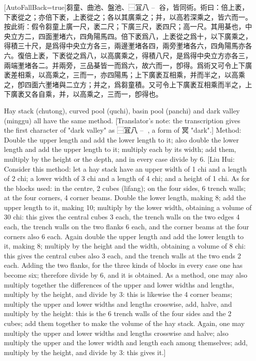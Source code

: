 \documentclass[11pt]{article}
\newcommand{\zhsmall}{\footnotesize\color{black!70}}
\newcommand{\unitlabel}[1]{\marginpar{\raggedleft\tiny\color{gray}#1}}
\newenvironment{unitzh}{\par\CJKfontspec{Noto Serif CJK SC}[AutoFallBack=true]\large\linespread{1.25}\selectfont}{\par}
\newenvironment{uniten}{\par\small\color{black!85}}{\par\medskip}
\begin{document}
\begin{unitzh}\unitlabel{jiuzhang-020.8}芻童、曲池、盤池、⿱冝八 -- 𡨋谷，皆同術。術曰：倍上袤，下袤從之；亦倍下袤，上袤從之；各以其廣乘之；并，以高若深乘之，皆六而一。{\zhsmall 按此術：假令芻童上廣一尺，袤二尺；下廣三尺，袤四尺；高一尺。其用棊也，中央立方二，四面壍堵六，四角陽馬四。倍下袤爲八，上袤從之爲十，以下廣乘之，得積三十尺，是爲得中央立方各三，兩邊壍堵各四，兩旁壍堵各六，四角陽馬亦各六。復倍上袤，下袤從之爲八，以高廣乘之，得積八尺，是爲得中央立方亦各三，兩端壍堵各二。并兩旁，三品棊皆一而爲六，故六而一，卽得。爲術又可令上下廣袤差相乘，以高乘之，三而一，亦四陽馬；上下廣袤互相乘，并而半之，以高乘之，卽四面六壍堵與二立方；并之，爲芻童積。又可令上下廣袤互相乘而半之，上下廣袤又各自乘，并，以高乘之，三而一，卽得也。}\end{unitzh}
\begin{uniten}Hay stack (chutong), curved pool (quchi), basin pool (panchi) and dark valley (minggu) all have the same method. [Translator's note: the transcription gives the first character of "dark valley" as ⿱冝八 -- 𡨋, a form of 冥 "dark".] Method: Double the upper length and add the lower length to it; also double the lower length and add the upper length to it; multiply each by its width; add them, multiply by the height or the depth, and in every case divide by 6. [Liu Hui: Consider this method: let a hay stack have an upper width of 1 chi and a length of 2 chi; a lower width of 3 chi and a length of 4 chi; and a height of 1 chi. As for the blocks used: in the centre, 2 cubes (lifang); on the four sides, 6 trench walls; at the four corners, 4 corner beams. Double the lower length, making 8; add the upper length to it, making 10; multiply by the lower width, obtaining a volume of 30 chi: this gives the central cubes 3 each, the trench walls on the two edges 4 each, the trench walls on the two flanks 6 each, and the corner beams at the four corners also 6 each. Again double the upper length and add the lower length to it, making 8; multiply by the height and the width, obtaining a volume of 8 chi: this gives the central cubes also 3 each, and the trench walls at the two ends 2 each. Adding the two flanks, for the three kinds of blocks in every case one has become six; therefore divide by 6, and it is obtained. As a method, one may also multiply together the differences of the upper and lower widths and lengths, multiply by the height, and divide by 3: this is likewise the 4 corner beams; multiply the upper and lower widths and lengths crosswise, add, halve, and multiply by the height: this is the 6 trench walls of the four sides and the 2 cubes; add them together to make the volume of the hay stack. Again, one may multiply the upper and lower widths and lengths crosswise and halve; also multiply the upper and the lower width and length each among themselves; add, multiply by the height, and divide by 3: this gives it.]\end{uniten}
\end{document}
